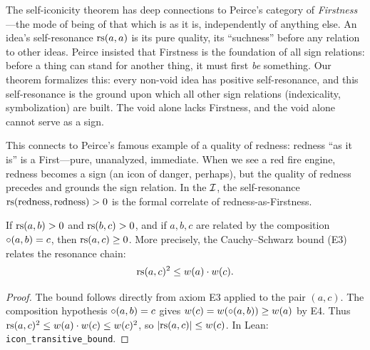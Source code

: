 \begin{interpretation}
The self-iconicity theorem has deep connections to Peirce's category of \emph{Firstness}---the mode of being of that which is as it is, independently of anything else. An idea's self-resonance $\mathrm{rs}(a, a)$ is its pure quality, its ``suchness'' before any relation to other ideas. Peirce insisted that Firstness is the foundation of all sign relations: before a thing can stand for another thing, it must first \emph{be} something. Our theorem formalizes this: every non-void idea has positive self-resonance, and this self-resonance is the ground upon which all other sign relations (indexicality, symbolization) are built. The void alone lacks Firstness, and the void alone cannot serve as a sign.

This connects to Peirce's famous example of a quality of redness: redness ``as it is'' is a First---pure, unanalyzed, immediate. When we see a red fire engine, redness becomes a sign (an icon of danger, perhaps), but the quality of redness precedes and grounds the sign relation. In the $\mathcal{I}$, the self-resonance $\mathrm{rs}(\text{redness}, \text{redness}) > 0$ is the formal correlate of redness-as-Firstness.
\end{interpretation}

\begin{theorem}
\label{thm:icon-transitive}
If $\mathrm{rs}(a, b) > 0$ and $\mathrm{rs}(b, c) > 0$, and if $a, b, c$ are related by the composition $\circ(a, b) = c$, then $\mathrm{rs}(a, c) \geq 0$. More precisely, the Cauchy--Schwarz bound (E3) relates the resonance chain:
\[
  \mathrm{rs}(a, c)^2 \leq w(a) \cdot w(c).
\]
\end{theorem}

\begin{proof}
The bound follows directly from axiom E3 applied to the pair $(a, c)$. The composition hypothesis $\circ(a, b) = c$ gives $w(c) = w(\circ(a, b)) \geq w(a)$ by E4. Thus $\mathrm{rs}(a, c)^2 \leq w(a) \cdot w(c) \leq w(c)^2$, so $|\mathrm{rs}(a, c)| \leq w(c)$. In Lean: \texttt{icon\_transitive\_bound}.
\end{proof}

